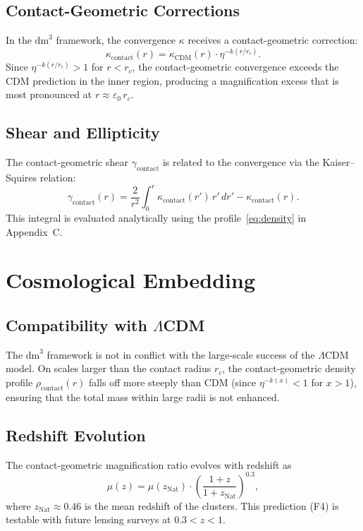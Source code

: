 \documentclass[11pt,a4paper,openright]{book}
\theoremstyle{dm3thm}
\theoremstyle{dm3def}
\newcommand{\dm}{\mathrm{dm}^3}
\newcommand{\eps}{\varepsilon_0}
\newcommand{\kc}{\kappa_{\mathrm{contact}}}
\newcommand{\kcdm}{\kappa_{\mathrm{CDM}}}
\newcommand{\rhocon}{\rho_{\mathrm{contact}}}
\newcommand{\rc}{r_c}
\newcommand{\etaT}{\eta}   %
\begin{document}
\section{Contact-Geometric Corrections}

In the $\dm$ framework, the convergence $\kappa$ receives a contact-geometric
correction:
\[
  \kc(r) = \kcdm(r)\cdot\etaT^{-k(r/\rc)}.
\]
Since $\etaT^{-k(r/\rc)} > 1$ for $r < \rc$, the contact-geometric convergence
exceeds the CDM prediction in the inner region, producing a magnification
excess that is most pronounced at $r \approx \eps\,\rc$.

\section{Shear and Ellipticity}

The contact-geometric shear $\gamma_{\mathrm{contact}}$ is related to the
convergence via the Kaiser--Squires relation:
\[
  \gamma_{\mathrm{contact}}(r)
  = \frac{2}{r^2}\int_0^r \kc(r')\,r'\,dr' - \kc(r).
\]
This integral is evaluated analytically using the profile~\eqref{eq:density}
in Appendix~C.

\chapter{Cosmological Embedding}
\label{ch:cosmology}

\section{Compatibility with \texorpdfstring{$\Lambda$CDM}{ΛCDM}}

The $\dm$ framework is not in conflict with the large-scale success of the
$\Lambda$CDM model.  On scales larger than the contact radius $\rc$, the
contact-geometric density profile $\rhocon(r)$ falls off more steeply than
CDM (since $\etaT^{-k(x)} < 1$ for $x > 1$), ensuring that the total mass
within large radii is not enhanced.

\section{Redshift Evolution}

The contact-geometric magnification ratio evolves with redshift as
\begin{equation}\label{eq:zevolution}
  \mu(z) = \mu(z_{\mathrm{Nat}})\cdot\left(\frac{1+z}{1+z_{\mathrm{Nat}}}\right)^{0.3},
\end{equation}
where $z_{\mathrm{Nat}} \approx 0.46$ is the mean redshift of the
\citet{NatarajanChiangDutra2026} clusters.  This prediction (F4) is
testable with future lensing surveys at $0.3 < z < 1$.
\end{document}
